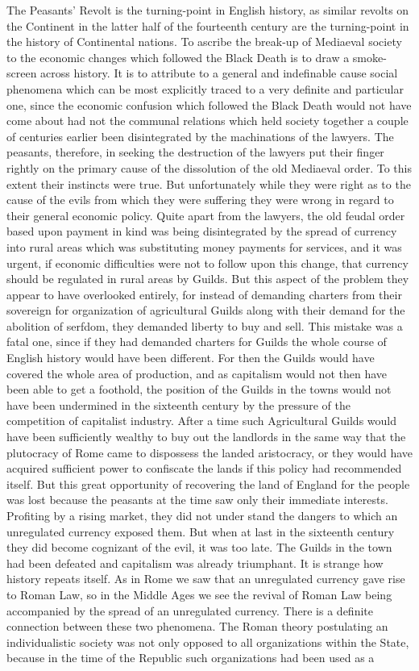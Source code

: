 \documentclass{book}
\begin{document}
The Peasants’ Revolt is the turning-point in English history, as similar revolts on the Continent in the latter half of the fourteenth century are the turning-point in the history of Continental nations. To ascribe the break-up of Mediaeval society to the economic changes which followed the Black Death is to draw a smoke-screen across history. It is to attribute to a general and indefinable cause social phenomena which can be most explicitly traced to a very definite and particular one, since the economic confusion which followed the Black Death would not have come about had not the communal relations which held society together a couple of centuries earlier been disintegrated by the machinations of the lawyers. The peasants, therefore, in seeking the destruction of the lawyers put their finger rightly on the primary cause of the dissolution of the old Mediaeval order. To this extent their instincts were true. But unfortunately while they were right as to the cause of the evils from which they were suffering they were wrong in regard to their general economic policy. Quite apart from the lawyers, the old feudal order based upon payment in kind was being disintegrated by the spread of currency into rural areas which was substituting money payments for services, and it was urgent, if economic difficulties were not to follow upon this change, that currency should be regulated in rural areas by Guilds. But this aspect of the problem they appear to have overlooked entirely, for instead of demanding charters from their sovereign for organization of agricultural Guilds along with their demand for the abolition of serfdom, they demanded liberty to buy and sell. This mistake was a fatal one, since if they had demanded charters for Guilds the whole course of English history would have been different. For then the Guilds would have covered the whole area of production, and as capitalism would not then have been able to get a foothold, the position of the Guilds in the towns would not have been undermined in the sixteenth century by the pressure of the competition of capitalist industry. After a time such Agricultural Guilds would have been sufficiently wealthy to buy out the landlords in the same way that the plutocracy of Rome came to dispossess the landed aristocracy, or they would have acquired sufficient power to confiscate the lands if this policy had recommended itself. But this great opportunity of recovering the land of England for the people was lost because the peasants at the time saw only their immediate interests. Profiting by a rising market, they did not under stand the dangers to which an unregulated currency exposed them. But when at last in the sixteenth century they did become cognizant of the evil, it was too late. The Guilds in the town had been defeated and capitalism was already triumphant. It is strange how history repeats itself. As in Rome we saw that an unregulated currency gave rise to Roman Law, so in the Middle Ages we see the revival of Roman Law being accompanied by the spread of an unregulated currency. There is a definite connection between these two phenomena. The Roman theory postulating an individualistic society was not only opposed to all organizations within the State, because in the time of the Republic such organizations had been used as a 
\end{document}
